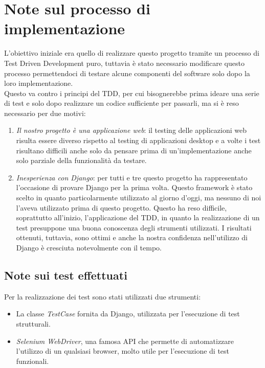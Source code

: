 \documentclass[10pt,a4paper]{report}
\begin{document}
	\section{Note sul processo di implementazione}
	L'obiettivo iniziale era quello di realizzare questo progetto tramite un processo di Test Driven Development puro, tuttavia è stato necessario modificare questo processo permettendoci di testare alcune componenti del software solo dopo la loro implementazione. \\
	Questo va contro i principi del TDD, per cui bisognerebbe prima ideare una serie di test e solo dopo realizzare un codice sufficiente per passarli, ma si è reso necessario per due motivi:
	\begin{enumerate}
		\item \textit{Il nostro progetto è una applicazione web}: il testing delle applicazioni web risulta essere diverso rispetto al testing di applicazioni desktop e a volte i test risultano difficili anche solo da pensare prima di un'implementazione anche solo parziale della funzionalità da testare.
		\item \textit{Inesperienza con Django}: per tutti e tre questo progetto ha rappresentato l'occasione di provare Django per la prima volta. Questo framework è stato scelto in quanto particolarmente utilizzato al giorno d'oggi, ma nessuno di noi l'aveva utilizzato prima di questo progetto. Questo ha reso difficile, soprattutto all'inizio, l'applicazione del TDD, in quanto la realizzazione di un test presuppone una buona conoscenza degli strumenti utilizzati. I risultati ottenuti, tuttavia, sono ottimi e anche la nostra confidenza nell'utilizzo di Django è cresciuta notevolmente con il tempo.
	\end{enumerate}

	\subsection{Note sui test effettuati}
	Per la realizzazione dei test sono stati utilizzati due strumenti:
	\begin{itemize}
		\item La classe \textit{TestCase} fornita da Django, utilizzata per l'esecuzione di test strutturali.
		\item \textit{Selenium WebDriver}, una famosa API che permette di automatizzare l'utilizzo di un qualsiasi browser, molto utile per l'esecuzione di test funzionali.
	\end{itemize}
\end{document}
